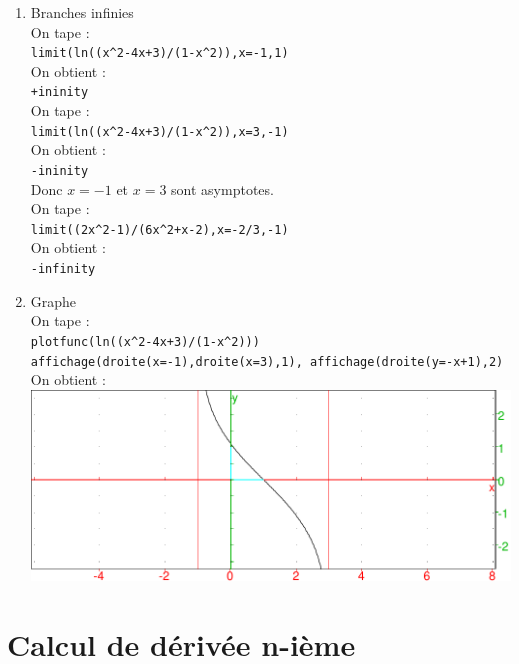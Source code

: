 \documentclass[a4paper,11pt]{book}
\begin{document}
\begin{enumerate}
\item Branches infinies\\
On tape :\\
{\tt limit(ln((x\verb|^|2-4x+3)/(1-x\verb|^|2)),x=-1,1)}\\
On obtient :\\
{\tt +ininity}\\
On tape :\\
{\tt limit(ln((x\verb|^|2-4x+3)/(1-x\verb|^|2)),x=3,-1)}\\
On obtient :\\
{\tt -ininity}\\
Donc $x=-1$ et $x=3$ sont asymptotes.\\
On tape :\\
{\tt limit((2x\verb|^|2-1)/(6x\verb|^|2+x-2),x=-2/3,-1)}\\
On obtient :\\
{\tt -infinity}\\
\item Graphe\\
On tape :\\
{\tt plotfunc(ln((x\verb|^|2-4x+3)/(1-x\verb|^|2)))}\\
{\tt affichage(droite(x=-1),droite(x=3),1),
affichage(droite(y=-x+1),2)}\\
On obtient :\\
\includegraphics[width=\textwidth]{graphexo1}
\end{enumerate}


\section{Calcul de d\'eriv\'ee n-i\`eme}
\end{document}
